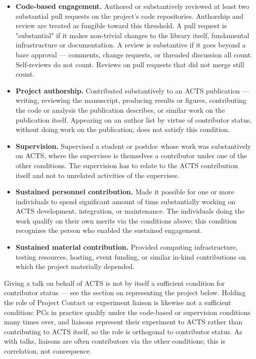 \documentclass[11pt,a4paper]{article}
\begin{document}
\begin{itemize}
    \item \textbf{Code-based engagement.} Authored or substantively reviewed at
          least two substantial pull requests on the project's code repositories.
          Authorship and review are treated as fungible toward this threshold. A
          pull request is "substantial" if it makes non-trivial changes to the
          library itself, fundamental infrastructure or documentation. A review 
          is substantive if it goes beyond a bare approval ---
          comments, change requests, or threaded discussion all count. Self-reviews
          do not count. Reviews on pull requests that did not merge still count.
    \item \textbf{Project authorship.} Contributed substantively to an ACTS
          publication --- writing, reviewing the manuscript, producing results or
          figures, contributing the code or analysis the publication describes, or
          similar work on the publication itself. Appearing on an author list by
          virtue of contributor status, without doing work on the publication, does
          not satisfy this condition.
    \item \textbf{Supervision.} Supervised a student or postdoc whose work was
          substantively on ACTS, where the supervisee is themselves a contributor
          under one of the other conditions. The supervision has to relate to the 
          ACTS contribution itself and not to unrelated activities of the supervisee.
    \item \textbf{Sustained personnel contribution.} Made it possible for one or
          more individuals to spend significant amount of time substantially
          working on ACTS development, integration, or maintenance. The
          individuals doing the work qualify on their own merits via the
          conditions above; this condition recognizes the person who enabled the
          sustained engagement.
    \item \textbf{Sustained material contribution.} Provided computing
          infrastructure, testing resources, hosting, event funding, or similar
          in-kind contributions on which the project materially depended.
\end{itemize}

Giving a talk on behalf of ACTS is not by itself a sufficient condition for
contributor status --- see the section on representing the project below. Holding
the role of Project Contact or experiment liaison is likewise not a sufficient
condition: PCs in practice qualify under the code-based or supervision conditions
many times over, and liaisons represent their experiment to ACTS rather than
contributing to ACTS itself, so the role is orthogonal to contributor status. As
with talks, liaisons are often contributors via the other conditions; this is
correlation, not consequence.
\end{document}
